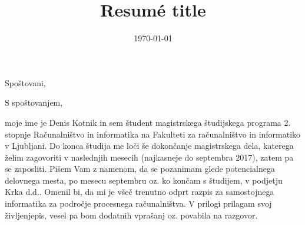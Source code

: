 \documentclass[11pt,a4paper,sans]{moderncv}        %
\title{Resumé title}                               %
\begin{document}
\date{\today}
\opening{Spoštovani,}
\closing{S spoštovanjem,}
\makelettertitle
moje ime je Denis Kotnik in sem študent magistrskega študijskega programa 2. stopnje Računalništvo in informatika na Fakulteti za računalništvo in informatiko v Ljubljani.
\newline
Do konca študija me loči še dokončanje magistrskega dela, katerega želim zagovoriti v naslednjih mesecih (najkasneje do septembra 2017), zatem pa se zaposliti.
\newline
\newline
Pišem Vam z namenom, da se pozanimam glede potencialnega delovnega mesta, po mesecu septembru oz. ko končam s študijem, v podjetju Krka d.d..
\newline
Omenil bi, da mi je všeč trenutno odprt razpis za samostojnega informatika za področje procesnega računalništva.
\newline
\newline
V prilogi prilagam svoj življenjepis, vesel pa bom dodatnih vprašanj oz. povabila na razgovor.
\newline
\newline

\makeletterclosing
\end{document}
